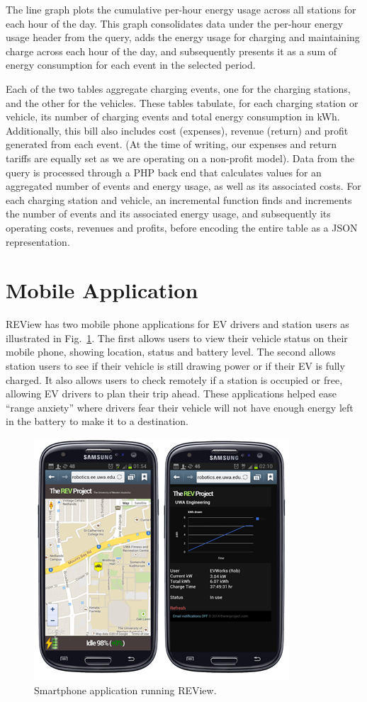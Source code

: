 The line graph plots the cumulative per-hour energy usage across all stations for each hour of the day. This graph consolidates data under the per-hour energy usage header from the query, adds the energy usage for charging and maintaining charge across each hour of the day, and subsequently presents it as a sum of energy consumption for each event in the selected period. 

Each of the two tables aggregate charging events, one for the charging stations, and the other for the vehicles. These tables tabulate, for each charging station or vehicle, its number of charging events and total energy consumption in kWh. Additionally, this bill also includes cost (expenses), revenue (return) and profit generated from each event. (At the time of writing, our expenses and return tariffs are equally set as we are operating on a non-profit model). Data from the query is processed through a PHP back end that calculates values for an aggregated number of events and energy usage, as well as its associated costs. For each charging station and vehicle, an incremental function finds and increments the number of events and its associated energy usage, and subsequently its operating costs, revenues and profits, before encoding the entire table as a JSON representation.

\section{Mobile Application}
\label{sec:9:app}
REView has two mobile phone applications for EV drivers and station users as illustrated in Fig.~\ref{fig:9:app}. The first allows users to view their vehicle status on their mobile phone, showing location, status and battery level. The second allows station users to see if their vehicle is still drawing power or if their EV is fully charged. It also allows users to check remotely if a station is occupied or free, allowing EV drivers to plan their trip ahead. These applications helped ease ``range anxiety'' where drivers fear their vehicle will not have enough energy left in the battery to make it to a destination.

\begin{figure}[H]
	\centering
	\includegraphics[width=0.7\linewidth]{smartphone}
	\caption{Smartphone application running REView.}
	\label{fig:9:app}
\end{figure}

